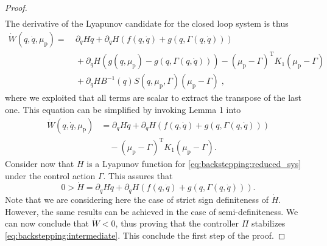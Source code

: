 \begin{proof}
\begin{equation*}
\begin{split}
		\end{split}
	\end{equation*}
	The derivative of the Lyapunov candidate for the closed loop system is thus
	\begin{equation*}
	\begin{split}
	\dot{W}(q,\dot{q},\mu_\mathrm{p}) =& \: \partial_{q} H \dot{q} + \partial_{\dot{q}} H (f(q,\dot{q}) + g(q,\Gamma(q,\dot{q}))) \\
	&\: + \partial_{\dot{q}} H (g(q,\mu_\mathrm{p}) - g(q,\Gamma(q,\dot{q}))) - (\mu_\mathrm{p} - \Gamma)^{\mathrm{T}}K_1(\mu_\mathrm{p} - \Gamma) \\
	&\: +  \partial_{\dot{q}} H B^{-1}(q) S(q,\mu_\mathrm{p},\Gamma) (\mu_\mathrm{p} - \Gamma)\;,
	\end{split}
	\end{equation*}
	where we exploited that all terms are scalar to extract the transpose of the last one. This equation can be  simplified by invoking Lemma 1 into
	\begin{equation}
	\begin{split}
	\dot{W}(q,\dot{q},\mu_\mathrm{p}) &=  \partial_{q} H \dot{q} + \partial_{\dot{q}} H (f(q,\dot{q}) + g(q,\Gamma(q,\dot{q}))) \\
	&\quad - (\mu_\mathrm{p} - \Gamma)^{\mathrm{T}}K_1(\mu_\mathrm{p} - \Gamma).
	\end{split}
	\end{equation}
	Consider now that $H$ is a Lyapunov function for \eqref{eq:backstepping:reduced_sys} under the control action $\Gamma$. This assures that
	\begin{equation}
		0 > \dot{H} = \partial_{q} H \dot{q} + \partial_{\dot{q}} H (f(q,\dot{q}) + g(q,\Gamma(q,\dot{q}))).
	\end{equation}
	Note that we are considering here the case of strict sign definiteness of $\dot{H}$. However, the same results can be achieved in the case of semi\--definiteness.
	We can now conclude that $\dot{W} < 0$, thus proving that the controller $\Pi$ stabilizes \eqref{eq:backstepping:intermediate}. This conclude the first step of the proof.
	

\end{proof}
